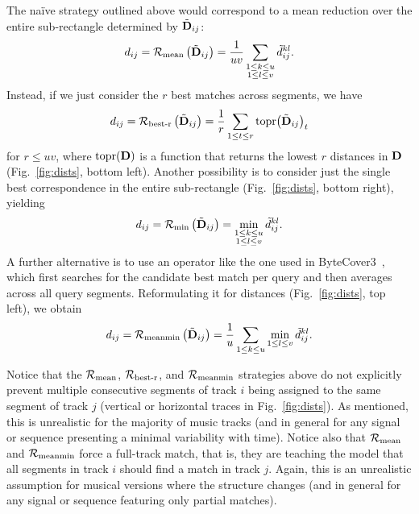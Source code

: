 The naïve strategy outlined above would correspond to a mean reduction over the entire sub-rectangle determined by $\tilde{\textbf{D}}_{ij}$:
\begin{equation*}
d_{ij} = \mathcal{R}_{\text{mean}}\left(\tilde{\textbf{D}}_{ij}\right) = \frac{1}{uv} \sum_{\substack{1\leq k\leq u\\1\leq l\leq v}} \tilde{d}^{kl}_{ij} .
\end{equation*}
Instead, if we just consider the $r$ best matches across segments, we have
\begin{equation*}
d_{ij} = \mathcal{R}_{\text{best-r}}\left(\tilde{\textbf{D}}_{ij}\right) = \frac{1}{r} \sum_{1\leq t\leq r} \text{topr}\!\left(\tilde{\textbf{D}}_{ij}\right)_t
\end{equation*}
for $r\leq uv$, where $\text{topr}(\textbf{D})$ is a function that returns the lowest $r$ distances in $\textbf{D}$ (Fig.~\ref{fig:dists}, bottom left). Another possibility is to consider just the single best correspondence in the entire sub-rectangle (Fig.~\ref{fig:dists}, bottom right), yielding
\begin{equation*}
d_{ij} = \mathcal{R}_{\text{min}}\left(\tilde{\textbf{D}}_{ij}\right) = \min_{\substack{1\leq k\leq u\\1\leq l\leq v}} \tilde{d}^{kl}_{ij} .
\end{equation*}
A further alternative is to use an operator like the one used in ByteCover3~\cite{du_bytecover3_2023}, which first searches for the candidate best match per query and then averages across all query segments. Reformulating it for distances (Fig.~\ref{fig:dists}, top left), we obtain 
\begin{equation*}
d_{ij} = \mathcal{R}_{\text{meanmin}}\left(\tilde{\textbf{D}}_{ij}\right) = \frac{1}{u} \sum_{1\leq k\leq u} \min_{1\leq l\leq v} \tilde{d}^{kl}_{ij} .
\end{equation*}

Notice that the $\mathcal{R}_{\text{mean}}$, $\mathcal{R}_{\text{best-r}}$, and $\mathcal{R}_{\text{meanmin}}$ strategies above do not explicitly prevent multiple consecutive segments of track $i$ being assigned to the same segment of track $j$ (vertical or horizontal traces in Fig.~\ref{fig:dists}). As mentioned, this is unrealistic for the majority of music tracks (and in general for any signal or sequence presenting a minimal variability with time). Notice also that $\mathcal{R}_{\text{mean}}$ and $\mathcal{R}_{\text{meanmin}}$ force a full-track match, that is, they are teaching the model that all segments in track $i$ should find a match in track $j$. Again, this is an unrealistic assumption for musical versions where the structure changes (and in general for any signal or sequence featuring only partial matches). 

